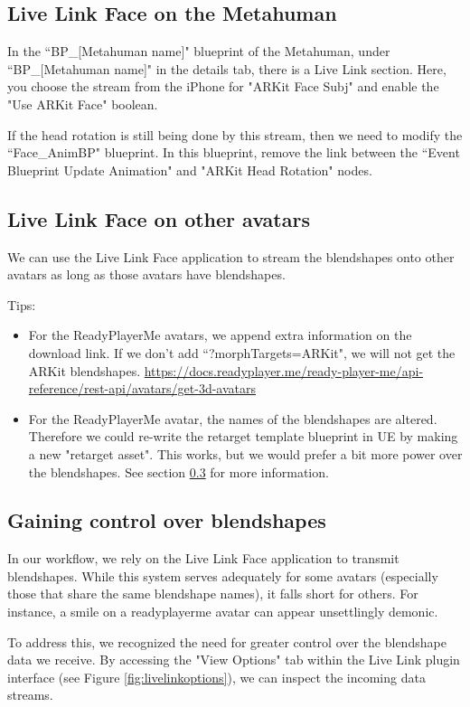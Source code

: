 \documentclass{uva-inf-article}
\begin{document}
\subsection{Live Link Face on the Metahuman}
In the ``BP\_[Metahuman name]" blueprint of the Metahuman, under ``BP\_[Metahuman name]" in the details tab, there is a Live Link section. Here, you choose the stream from the iPhone for "ARKit Face Subj" and enable the "Use ARKit Face" boolean.

If the head rotation is still being done by this stream, then we need to modify the ``Face\_AnimBP" blueprint. In this blueprint, remove the link between the ``Event Blueprint Update Animation" and "ARKit Head Rotation" nodes.

\subsection{Live Link Face on other avatars}
We can use the Live Link Face application to stream the blendshapes onto other avatars as long as those avatars have blendshapes. 

Tips:
\begin{itemize}
    \item For the ReadyPlayerMe avatars, we append extra information on the download link. If we don't add ``?morphTargets=ARKit", we will not get the ARKit blendshapes.
    \url{https://docs.readyplayer.me/ready-player-me/api-reference/rest-api/avatars/get-3d-avatars}
    \item For the ReadyPlayerMe avatar, the names of the blendshapes are altered. Therefore we could re-write the retarget template blueprint in UE by making a new "retarget asset". This works, but we would prefer a bit more power over the blendshapes. See section \ref{blendshapescontrol} for more information.
\end{itemize}

\subsection{Gaining control over blendshapes}\label{blendshapescontrol}
In our workflow, we rely on the Live Link Face application to transmit blendshapes. While this system serves adequately for some avatars (especially those that share the same blendshape names), it falls short for others. For instance, a smile on a readyplayerme avatar can appear unsettlingly demonic.

To address this, we recognized the need for greater control over the blendshape data we receive. By accessing the "View Options" tab within the Live Link plugin interface (see Figure \ref{fig:livelinkoptions}), we can inspect the incoming data streams.
\end{document}
